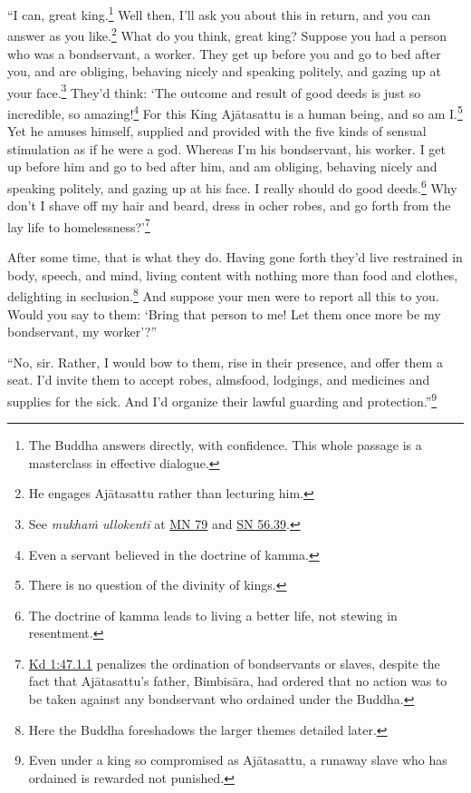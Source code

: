 \documentclass[12pt,openany]{book}%
\begin{document}
“I can, great king.\footnote{The Buddha answers directly, with confidence. This whole passage is a masterclass in effective dialogue. } Well then, I’ll ask you about this in return, and you can answer as you like.\footnote{He engages \textsanskrit{Ajātasattu} rather than lecturing him. } What do you think, great king? Suppose you had a person who was a bondservant, a worker. They get up before you and go to bed after you, and are obliging, behaving nicely and speaking politely, and gazing up at your face.\footnote{See \textit{\textsanskrit{mukhaṁ} \textsanskrit{ullokentī}} at \href{https://suttacentral.net/mn79/en/sujato}{MN 79} and \href{https://suttacentral.net/sn56.39/en/sujato}{SN 56.39}. } They’d think: ‘The outcome and result of good deeds is just so incredible, so amazing!\footnote{Even a servant believed in the doctrine of kamma. } For this King \textsanskrit{Ajātasattu} is a human being, and so am I.\footnote{There is no question of the divinity of kings. } Yet he amuses himself, supplied and provided with the five kinds of sensual stimulation as if he were a god. Whereas I’m his bondservant, his worker. I get up before him and go to bed after him, and am obliging, behaving nicely and speaking politely, and gazing up at his face. I really should do good deeds.\footnote{The doctrine of kamma leads to living a better life, not stewing in resentment. } Why don’t I shave off my hair and beard, dress in ocher robes, and go forth from the lay life to homelessness?’\footnote{\href{https://suttacentral.net/pli-tv-kd1/en/sujato\#47.1.1}{Kd 1:47.1.1} penalizes the ordination of bondservants or slaves, despite the fact that \textsanskrit{Ajātasattu}’s father, \textsanskrit{Bimbisāra}, had ordered that no action was to be taken against any bondservant who ordained under the Buddha. } 

After some time, that is what they do. Having gone forth they’d live restrained in body, speech, and mind, living content with nothing more than food and clothes, delighting in seclusion.\footnote{Here the Buddha foreshadows the larger themes detailed later. } And suppose your men were to report all this to you. Would you say to them: ‘Bring that person to me! Let them once more be my bondservant, my worker’?” 

“No, sir. Rather, I would bow to them, rise in their presence, and offer them a seat. I’d invite them to accept robes, almsfood, lodgings, and medicines and supplies for the sick. And I’d organize their lawful guarding and protection.”\footnote{Even under a king so compromised as \textsanskrit{Ajātasattu},  a runaway slave who has ordained is rewarded not punished. } 
\end{document}
